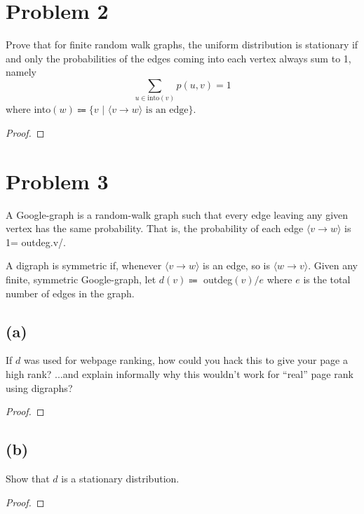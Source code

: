 \documentclass[14pt]{extarticle}
\begin{document}
\section{Problem 2}
Prove that for finite random walk graphs, the uniform distribution is stationary if and only the probabilities of the edges coming into each vertex always sum to 1, namely
$$
\sum_{u \in \text{into}(v)} p(u,v) = 1
$$
where into$(w) \Coloneqq \{v\,\, | \,\,\langle v \to w\rangle \text{ is an edge}\}$.
\begin{proof}
\end{proof}

\section{Problem 3}
A Google-graph is a random-walk graph such that every edge leaving any given vertex has the same proba­bility. That is, the probability of each edge $\langle v \to w \rangle$ is 1= outdeg.v/.

A digraph is symmetric if, whenever $\langle v \to w\rangle$ is an edge, so is $\langle w \to v\rangle$. Given any finite, symmetric Google-graph, let $d(v) \Coloneqq$ outdeg$(v) / e$ where $e$ is the total number of edges in the graph.

\subsection{(a)}
If $d$ was used for webpage ranking, how could you hack this to give your page a high rank? ...and explain informally why this wouldn’t work for “real” page rank using digraphs?

\begin{proof}
\end{proof}

\subsection{(b)}
Show that $d$ is a stationary distribution.

\begin{proof}
\end{proof}
\end{document}
